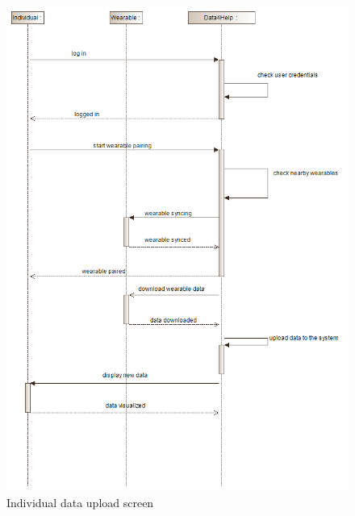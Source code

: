 \begin{figure}[H]
	\centering
  \includegraphics[width=0.79\linewidth]{resources/UML/IndividualInteraction.png}
  \caption{Individual data upload screen}
  \label{fig:Individual sequence diagram}
\end{figure}

